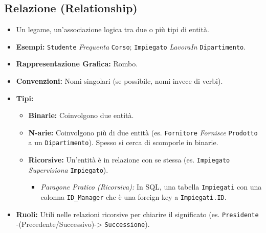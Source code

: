 \documentclass{article}
\begin{document}
	\subsection{Relazione (Relationship)}
	\begin{itemize}
		\item Un legame, un'associazione logica tra due o più tipi di entità.
		\item \textbf{Esempi:} \texttt{Studente} \textit{Frequenta} \texttt{Corso}; \texttt{Impiegato} \textit{LavoraIn} \texttt{Dipartimento}.
		\item \textbf{Rappresentazione Grafica:} Rombo.
		\item \textbf{Convenzioni:} Nomi singolari (se possibile, nomi invece di verbi).
		\item \textbf{Tipi:}
		\begin{itemize}
			\item \textbf{Binarie:} Coinvolgono due entità.
			\item \textbf{N-arie:} Coinvolgono più di due entità (es. \texttt{Fornitore} \textit{Fornisce} \texttt{Prodotto} a un \texttt{Dipartimento}). Spesso si cerca di scomporle in binarie.
			\item \textbf{Ricorsive:} Un'entità è in relazione con se stessa (es. \texttt{Impiegato} \textit{Supervisiona} \texttt{Impiegato}).
			\begin{itemize}
				\item \textit{Paragone Pratico (Ricorsiva):} In SQL, una tabella \texttt{Impiegati} con una colonna \texttt{ID\_Manager} che è una foreign key a \texttt{Impiegati.ID}.
			\end{itemize}
		\end{itemize}
		\item \textbf{Ruoli:} Utili nelle relazioni ricorsive per chiarire il significato (es. \texttt{Presidente} -(Precedente/Successivo)-> \texttt{Successione}).
	\end{itemize}
	
\end{document}
